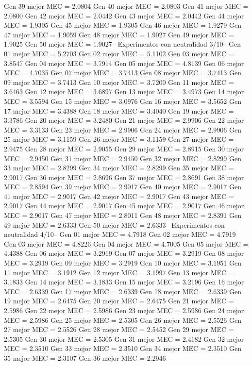 Gen 39 mejor MEC = 2.0804
Gen 40 mejor MEC = 2.0803
Gen 41 mejor MEC = 2.0800
Gen 42 mejor MEC = 2.0442
Gen 43 mejor MEC = 2.0442
Gen 44 mejor MEC = 1.9305
Gen 45 mejor MEC = 1.9305
Gen 46 mejor MEC = 1.9279
Gen 47 mejor MEC = 1.9059
Gen 48 mejor MEC = 1.9027
Gen 49 mejor MEC = 1.9025
Gen 50 mejor MEC = 1.9027
--Experimentos con neutralidad 3/10--
Gen 01 mejor MEC = 5.2703
Gen 02 mejor MEC = 5.1102
Gen 03 mejor MEC = 3.8547
Gen 04 mejor MEC = 3.7914
Gen 05 mejor MEC = 4.8139
Gen 06 mejor MEC = 4.7035
Gen 07 mejor MEC = 3.7413
Gen 08 mejor MEC = 3.7413
Gen 09 mejor MEC = 3.7413
Gen 10 mejor MEC = 3.7200
Gen 11 mejor MEC = 3.6463
Gen 12 mejor MEC = 3.6897
Gen 13 mejor MEC = 3.4973
Gen 14 mejor MEC = 3.5594
Gen 15 mejor MEC = 3.0976
Gen 16 mejor MEC = 3.5652
Gen 17 mejor MEC = 3.4388
Gen 18 mejor MEC = 3.4040
Gen 19 mejor MEC = 3.3786
Gen 20 mejor MEC = 3.2480
Gen 21 mejor MEC = 2.9906
Gen 22 mejor MEC = 3.3133
Gen 23 mejor MEC = 2.9906
Gen 24 mejor MEC = 2.9906
Gen 25 mejor MEC = 3.1159
Gen 26 mejor MEC = 3.1159
Gen 27 mejor MEC = 2.9475
Gen 28 mejor MEC = 2.9055
Gen 29 mejor MEC = 2.8915
Gen 30 mejor MEC = 2.9450
Gen 31 mejor MEC = 2.9450
Gen 32 mejor MEC = 2.8299
Gen 33 mejor MEC = 2.8299
Gen 34 mejor MEC = 2.8299
Gen 35 mejor MEC = 2.9017
Gen 36 mejor MEC = 2.8696
Gen 37 mejor MEC = 2.8691
Gen 38 mejor MEC = 2.8594
Gen 39 mejor MEC = 2.9017
Gen 40 mejor MEC = 2.9017
Gen 41 mejor MEC = 2.9017
Gen 42 mejor MEC = 2.9017
Gen 43 mejor MEC = 2.9017
Gen 44 mejor MEC = 2.9017
Gen 45 mejor MEC = 2.9017
Gen 46 mejor MEC = 2.9017
Gen 47 mejor MEC = 2.8011
Gen 48 mejor MEC = 2.8391
Gen 49 mejor MEC = 2.6333
Gen 50 mejor MEC = 2.6333
--Experimentos con neutralidad 4/10--
Gen 01 mejor MEC = 4.7918
Gen 02 mejor MEC = 4.7919
Gen 03 mejor MEC = 4.8226
Gen 04 mejor MEC = 4.7005
Gen 05 mejor MEC = 4.4388
Gen 06 mejor MEC = 3.2919
Gen 07 mejor MEC = 3.2919
Gen 08 mejor MEC = 3.2919
Gen 09 mejor MEC = 3.2919
Gen 10 mejor MEC = 3.1951
Gen 11 mejor MEC = 3.1912
Gen 12 mejor MEC = 3.1997
Gen 13 mejor MEC = 3.1833
Gen 14 mejor MEC = 3.1833
Gen 15 mejor MEC = 3.2196
Gen 16 mejor MEC = 2.6339
Gen 17 mejor MEC = 2.6339
Gen 18 mejor MEC = 2.6339
Gen 19 mejor MEC = 2.6475
Gen 20 mejor MEC = 2.6475
Gen 21 mejor MEC = 2.5986
Gen 22 mejor MEC = 2.5986
Gen 23 mejor MEC = 2.5986
Gen 24 mejor MEC = 2.5986
Gen 25 mejor MEC = 2.5305
Gen 26 mejor MEC = 2.5526
Gen 27 mejor MEC = 2.5526
Gen 28 mejor MEC = 2.5452
Gen 29 mejor MEC = 2.5305
Gen 30 mejor MEC = 2.5305
Gen 31 mejor MEC = 2.4182
Gen 32 mejor MEC = 2.3510
Gen 33 mejor MEC = 2.3510
Gen 34 mejor MEC = 2.3510
Gen 35 mejor MEC = 2.3107
Gen 36 mejor MEC = 2.2946
